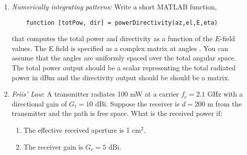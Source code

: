 \documentclass[11pt]{article}
\begin{document}
\begin{enumerate}
\item \emph{Numerically integrating patterns:}
Write a short MATLAB function,
\begin{lstlisting}
    function [totPow, dir] = powerDirectivity(az,el,E,eta)
\end{lstlisting}
that computes the total power and directivity as a function of the $E$-field
values.  The E field is specified as a complex matrix 
at angles .  You can assume that the angles are uniformly
spaced over  the total angular space.   The total power output
  should be a
scalar representing the total radiated power in dBm and the directivity output
should be  should be a matrix.

\item \emph{Friis' Law}:  A transmitter radiates 100 mW at a carrier $f_c = 2.1$ GHz
with a directional gain of $G_t = 10$ dBi.
Suppose the receiver is $d = 200$ m from the transmitter and the path is free space.
What is the received power if:
\begin{enumerate}[label=(\alph*)]
\item The effective received aperture is 1 cm$^2$.
\item The receiver gain is $G_r = 5$ dBi.
\end{enumerate}

\end{enumerate}
\end{document}
